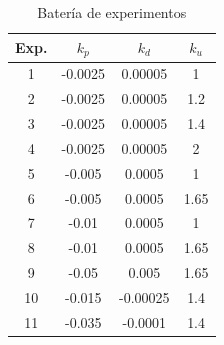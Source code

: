 \begin{table}[H]
\begin{center}
\begin{tabular}{|c|c|c|c|}
\hline
Exp. & $k_p$   & $k_d$    & $k_u$ \\ \hline
1    & -0.0025 & 0.00005  & 1    \\ \hline
2    & -0.0025 & 0.00005  & 1.2  \\ \hline
3    & -0.0025 & 0.00005  & 1.4  \\ \hline
4    & -0.0025 & 0.00005  & 2    \\ \hline
5    & -0.005  & 0.0005   & 1    \\ \hline
6    & -0.005  & 0.0005   & 1.65 \\ \hline
7    & -0.01   & 0.0005   & 1    \\ \hline
8    & -0.01   & 0.0005   & 1.65 \\ \hline
9    & -0.05   & 0.005    & 1.65 \\ \hline
10   & -0.015  & -0.00025 & 1.4  \\ \hline
11   & -0.035  & -0.0001  & 1.4  \\ \hline
\end{tabular}
\end{center}
\caption{Batería de experimentos}
\label{tabla51}
\end{table}

